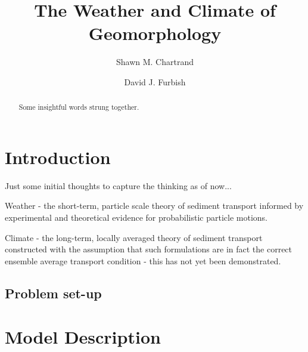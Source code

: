 \documentclass[12pt]{article}
\begin{document}
\title{The Weather and Climate of Geomorphology}
\date{}
\author[1]{\small Shawn M. Chartrand}
\author[1]{\small David J. Furbish}
\maketitle
\linenumbers
\pagebreak
\begin{abstract}
Some insightful words strung together.
\end{abstract}
\pagebreak
\section{Introduction}
Just some initial thoughts to capture the thinking as of now...\par
Weather - the short-term, particle scale theory of sediment transport informed by experimental and theoretical evidence for probabilistic particle motions.\par
Climate - the long-term, locally averaged theory of sediment transport constructed with the assumption that such formulations are in fact the correct ensemble average transport condition - this has not yet been demonstrated.
\subsection{Problem set-up}
\label{SSSetup}
\section{Model Description}
\end{document}
